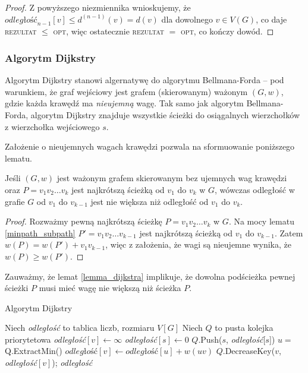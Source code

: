 \begin{theorem}
\begin{proof}
		Z powyższego niezmiennika wnioskujemy, że 
		$\textit{odległość}_{n-1}[v] \leq d^{(n-1)}(v) = d(v)$ dla dowolnego 
		$v \in V(G)$, co daje
		\textsc{rezultat} $\leq$ \textsc{opt},
		więc ostatecznie 	\textsc{rezultat} $=$ \textsc{opt}, co kończy dowód. \qedhere	
	\end{proof}
	\label{bellmanford_proof}
\end{theorem}

\subsubsection{Algorytm Dijkstry}
Algorytm Dijkstry stanowi algernatywę do algorytmu
Bellmana-Forda -- pod warunkiem, że graf wejściowy
jest grafem (skierowanym) ważonym $(G, w)$, 
gdzie każda krawędź ma \emph{nieujemną} wagę. 
Tak samo jak algorytm Bellmana-Forda, 
algorytm Dijkstry znajduje wszystkie ścieżki 
do osiągalnych wierzchołków z 
wierzchołka wejściowego $s$. 

Założenie o nieujemnych wagach krawędzi pozwala na 
sformuowanie poniższego lematu.
\begin{lemma}
	Jeśli $(G, w)$ jest ważonym grafem skierowanym
	bez ujemnych wag krawędzi oraz $P = v_1v_2\dots v_k$
	jest najkrótszą ścieżką od $v_1$ do $v_k$ w $G$,
	wówczas odległość w grafie $G$ od $v_1$ do $v_{k-1}$ jest 
	nie większa niż odległość od $v_1$ do $v_k$.
	\begin{proof}
		Rozważmy pewną najkrótszą ścieżkę $P = v_1v_2
		\dots v_k$ w $G$. Na mocy lematu 
		\ref{minpath_subpath} $P'=v_1v_2 \dots v_{k-1}$
		jest najkrótszą ścieżką od $v_1$ do $v_{k-1}$.
		Zatem $w(P) = w(P') + v_1v_{k-1}$, więc
		z założenia, że wagi są nieujemne
		wynika, że  
		$w(P) \geq w(P')$. 
	\end{proof}
	\label{lemma_dijkstra}
\end{lemma}

Zauważmy, że lemat \ref{lemma_dijkstra} implikuje, że
dowolna podścieżka pewnej ścieżki $P$ musi mieć wagę
nie większą niż ścieżka $P$.

\begin{algorithm}[H]
	\caption{Algorytm Dijkstry}\label{dijkstra_alg}
	\begin{algorithmic}[1]
		\State Niech \textit{odległość} to tablica liczb, rozmiaru $V[G]$
		\State Niech $Q$ to pusta kolejka priorytetowa 
		\State \textit{odległość}$[v]\gets\infty$
		\EndFor
		\State \textit{odległość}$[s]\gets 0$
		\State $Q$.Push($s$, \textit{odległość}[$s$])
		\State $u =$ Q.ExtractMin()
		\State $\textit{odległość}[v] \gets \textit{odległość}[u] + w(uv)$
		\State $Q$.DecreaseKey($v$, \textit{odległość}$[v]$);
		\EndIf
		\EndFor
		\EndWhile
		\State \Return \textit{odległość}
		\EndProcedure
	\end{algorithmic}
	\label{dijkstra}
\end{algorithm}

